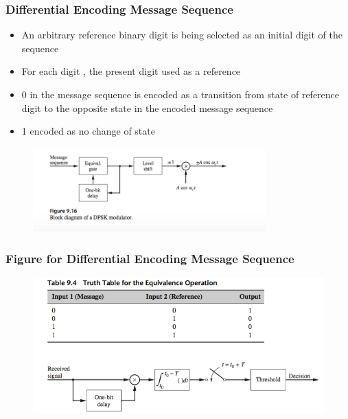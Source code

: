 \documentclass{beamer}
\begin{document}
\begin{frame}
	\frametitle{Differential Encoding Message Sequence}
	\begin{itemize}
		\item An arbitrary reference binary digit is being selected as an initial digit of the sequence
		\item For each digit , the present digit used as a reference
		\item 0 in the message sequence is encoded as  a transition from state of reference digit to the opposite state in the encoded message sequence
		\item 1 encoded as no change of state
	\end{itemize}
	\begin{figure}
		\includegraphics[width=0.8\textwidth]{9_3_1.png} \\
	\end{figure}
\end{frame}

\begin{frame}
\frametitle{Figure for Differential Encoding Message Sequence}
	\begin{figure}
		\includegraphics[width=\textwidth]{9_4_1.png}
	\end{figure}
\end{frame}		
\end{document}
